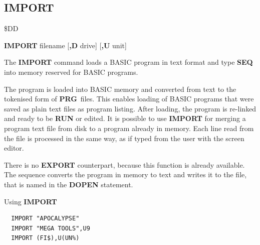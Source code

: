 \newpage
\subsection{IMPORT}
\begin{description}[leftmargin=2cm,style=nextline]
\item [Token:] \$DD
\item [Format:] {\bf IMPORT} filename [{\bf,D} drive] [{\bf,U} unit]
\item [Usage:]
   The {\bf IMPORT} command loads a BASIC program in text format and type
   {\bf SEQ} into memory reserved for BASIC programs.

   \filenamedefinition

   \drivedefinition

   \unitdefinition

\item [Remarks:]
   The program is loaded into BASIC memory and converted from text to the
   tokenised form of {\bf PRG} files. This enables loading of BASIC programs
   that were saved as plain text files as program listing.
   After loading, the program is re-linked
   and ready to be {\bf RUN} or edited.
   It is possible to use {\bf IMPORT} for merging a program text file
   from disk to a program already in memory.
   Each line read from the file is processed in the same way,
   as if typed from the user with the screen editor.

   There is no {\bf EXPORT} counterpart, because this function is
   already available. The sequence
   converts the program in memory to text and writes it to the
   file, that is named in the {\bf DOPEN} statement.

\item [Examples:] Using {\bf IMPORT}
\begin{tcolorbox}[colback=black,coltext=white]
\verbatimfont{\codefont}
\begin{verbatim}
  IMPORT "APOCALYPSE"
  IMPORT "MEGA TOOLS",U9
  IMPORT (FI$),U(UN%)
\end{verbatim}
\end{tcolorbox}
\end{description}


\newpage

